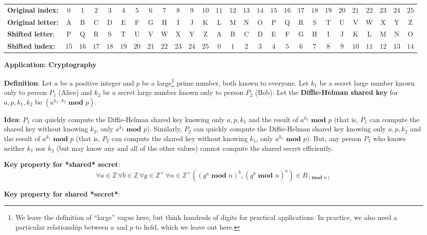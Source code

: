 \documentclass[12pt, oneside]{article}
\begin{document}
{\tiny
\begin{tabular}{lcccccccccccccccccccccccccc}
{\bf Original index:} & $0$ & $1$
 & $2$ & $3$ &  $4$ & $5$ &  $6$ & $7$ &  $8$ & $9$ & $10$ & $11$ & $12$ & $13$ & $14$ & $15$ & 
  $16$ & $17$ &  $18$ & $19$ &  $20$ & $21$ &  $22$ & $23$ & $24$ & $25$\\
{\bf Original letter:} & A & B& C & D & E & F& G& H & I & J & K & L &M & N& O &P &Q & R & S & T & U & V & W & X & Y & Z \\
{\bf Shifted letter}: &P &Q & R & S & T & U & V & W & X & Y & Z & A & B& C & D & E & F& G& H & I & J & K & L &M & N& O \\
{\bf Shifted index:} &$15$ & 
  $16$ & $17$ &  $18$ & $19$ &  $20$ & $21$ &  $22$ & $23$ & $24$ & $25$ & $0$ & $1$
 & $2$ & $3$ &  $4$ & $5$ &  $6$ & $7$ &  $8$ & $9$ & $10$ & $11$ & $12$ & $13$ & $14$ 
\end{tabular}
}
\vfill \vfill
\newpage
{\bf Application: Cryptography}

{\bf Definition}: Let $a$ be a positive integer and $p$ be a 
large\footnote{We leave the definition of ``large'' vague here, but 
think hundreds of digits for practical applications. In practice, 
we also need a particular relationship between $a$ and $p$ to hold, 
which we leave out here.} prime number, both known to everyone. 
Let $k_1$ be a secret large number known only to person $P_1$ (Alice) 
and $k_2$ be a secret large number known only to person $P_2$ (Bob). 
Let the {\bf Diffie-Helman shared key} for $a, p, k_1, k_2$ be 
$(a^{k_1\cdot k_2} \textbf{ mod } p)$.


{\bf Idea}: $P_1$ can quickly compute the Diffie-Helman shared key 
knowing only $a, p, k_1$ and the result of $a^{k_2} \textbf{ mod } p$ 
(that is, $P_1$ can compute the shared key without knowing $k_2$, 
only $a^{k_2} \textbf{ mod } p$). Similarly, $P_2$ can 
quickly compute the Diffie-Helman shared key knowing only 
$a, p, k_2$ and the result of $a^{k_1} \textbf{ mod } p$ 
(that is, $P_2$ can compute the shared key without knowing $k_1$, 
only $a^{k_1} \textbf{ mod } p$). But, any person $P_3$ who 
knows neither $k_1$ nor $k_2$ (but may know any and all of the other values) 
cannot compute the shared secret efficiently.

{\bf Key property for *shared* secret}: 
\[
    \forall a \in \mathbb{Z} \, \forall b \in \mathbb{Z} \, \forall g \in \mathbb{Z}^+ \, 
    \forall n \in \mathbb{Z}^+ ((g^a \textbf{ mod } n)^b, (g^b \textbf{ mod } n)^a) \in R_{(\textbf{mod } n)}
\]

{\bf Key property for shared *secret*}:
\end{document}
